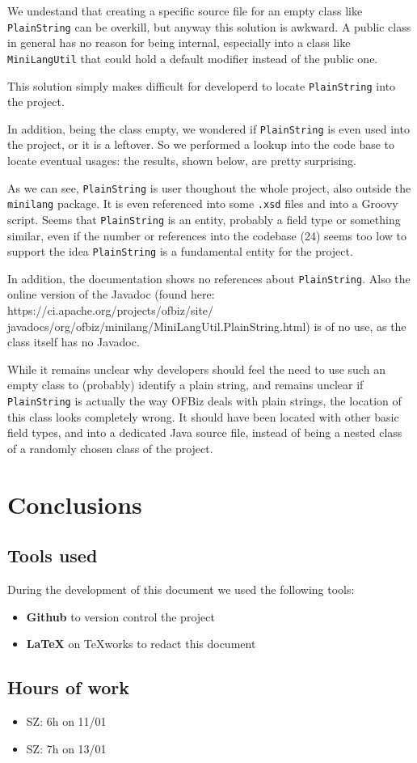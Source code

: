 \documentclass[11pt]{article} %
\begin{document}
We undestand that creating a specific source file for an empty class like \texttt{PlainString} can be overkill, but anyway this solution is awkward. A public class in general has no reason for being internal, especially into a class like \texttt{MiniLangUtil} that could hold a default modifier instead of the public one.

This solution simply makes difficult for developerd to locate \texttt{PlainString} into the project. 

In addition, being the class empty, we wondered if \texttt{PlainString} is even used into the project, or it is a leftover. So we performed a lookup into the code base to locate eventual usages: the results, shown below, are pretty surprising.



As we can see, \texttt{PlainString} is user thoughout the whole project, also outside the \texttt{minilang} package. It is even referenced into some \texttt{.xsd} files and into a Groovy script. Seems that \texttt{PlainString} is an entity, probably a field type or something similar, even if the number or references into the codebase (24) seems too low to support the idea \texttt{PlainString} is a fundamental entity for the project.

In addition, the documentation shows no references about \texttt{PlainString}. Also the online version of the Javadoc (found here: https://ci.apache.org/projects/ofbiz/site/ javadocs/org/ofbiz/minilang/MiniLangUtil.PlainString.html) is of no use, as the class itself has no Javadoc.

While it remains unclear why developers should feel the need to use such an empty class to (probably) identify a plain string, and remains unclear if \texttt{PlainString} is actually the way OFBiz deals with plain strings, the location of this class looks completely wrong. It should have been located with other basic field types, and into a dedicated Java source file, instead of being a nested class of a randomly chosen class of the project.


\section{Conclusions}

\subsection{Tools used}
During the development of this document we used the following tools:
\begin{itemize}
	\item \textbf{Github} to version control the project
	\item \textbf{\LaTeX} on TeXworks to redact this document
\end{itemize}

\subsection{Hours of work}
\begin{itemize}
	\item SZ: 6h on 11/01
	\item SZ: 7h on 13/01
\end{itemize}
\end{document}
